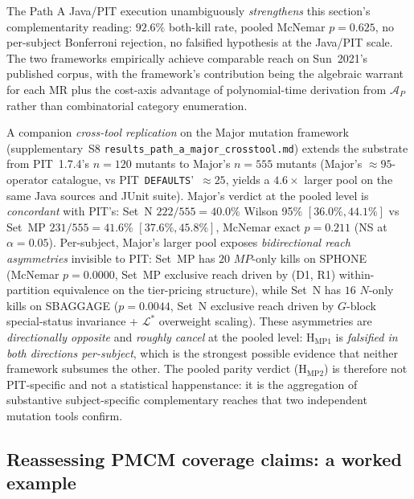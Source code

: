 \documentclass[acmsmall, screen]{acmart}
\begin{document}
The Path A Java/PIT execution unambiguously \emph{strengthens} this
section's complementarity reading: $92.6\%$ both-kill rate, pooled
McNemar $p = 0.625$, no per-subject Bonferroni rejection, no
falsified hypothesis at the Java/PIT scale. The two frameworks
empirically achieve comparable reach on Sun~2021's published
corpus, with the framework's contribution being the algebraic
warrant for each MR plus the cost-axis advantage of polynomial-time
derivation from $\mathcal{A}_P$ rather than combinatorial category
enumeration.

A companion \emph{cross-tool replication} on the Major mutation framework
(supplementary~S8 \texttt{results\_path\_a\_major\_crosstool.md}) extends the
substrate from PIT~1.7.4's $n = 120$ mutants to Major's $n = 555$ mutants
(Major's $\approx 95$-operator catalogue, vs PIT~\texttt{DEFAULTS}'~$\approx 25$,
yields a $4.6\times$ larger pool on the same Java sources and JUnit suite).
Major's verdict at the pooled level is \emph{concordant} with PIT's:
Set~N $222/555 = 40.0\%$ Wilson 95\% $[36.0\%, 44.1\%]$ vs Set~MP
$231/555 = 41.6\%$ $[37.6\%, 45.8\%]$, McNemar exact $p = 0.211$ (NS at
$\alpha = 0.05$). Per-subject, Major's larger pool exposes
\emph{bidirectional reach asymmetries} invisible to PIT: Set~MP has
$20$ $MP$-only kills on SPHONE (McNemar $p = 0.0000$, Set~MP exclusive
reach driven by (D1, R1) within-partition equivalence on the tier-pricing
structure), while Set~N has $16$ $N$-only kills on SBAGGAGE
($p = 0.0044$, Set~N exclusive reach driven by $G$-block special-status
invariance + $\mathcal{L}^{*}$ overweight scaling). These asymmetries are
\emph{directionally opposite} and \emph{roughly cancel} at the pooled
level: H$_{\mathrm{MP1}}$ is \emph{falsified in both directions per-subject},
which is the strongest possible evidence that neither framework subsumes
the other. The pooled parity verdict (H$_{\mathrm{MP2}}$) is therefore not
PIT-specific and not a statistical happenstance: it is the aggregation of
substantive subject-specific complementary reaches that two independent
mutation tools confirm.

\subsection{Reassessing PMCM coverage claims: a worked example}
\label{subsec:pmcm-worked}
\end{document}
